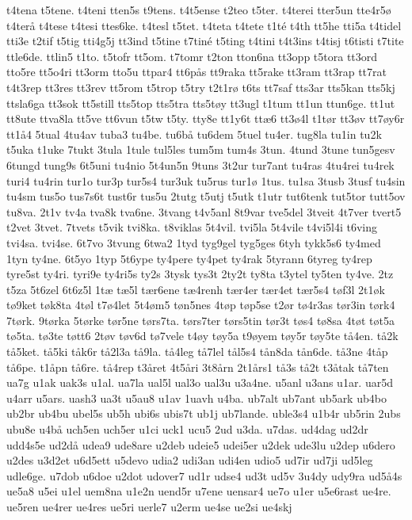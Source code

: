 {t4tena
t5tene.
t4teni
tten5s
t9tens.
t4t5ense
t2teo
t5ter.
t4terei
tter5un
tte4r5ø
t4terå
t4tese
t4tesi
ttes6ke.
t4tesl
t5tet.
t4teta
t4tete
t1té
t4th
tt5he
tti5a
t4tidel
tti3e
t2tif
t5tig
tti4g5j
tt3ind
t5tine
t7tiné
t5ting
t4tini
t4t3ins
t4tisj
t6tisti
t7tite
ttle6de.
ttlin5
t1to.
t5tofr
tt5om.
t7tomr
t2ton
tton6na
tt3opp
t5tora
tt3ord
tto5re
tt5o4ri
tt3orm
tto5u
ttpar4
tt6pås
tt9raka
tt5rake
tt3ram
tt3rap
tt7rat
t4t3rep
tt3res
tt3rev
tt5rom
t5trop
t5try
t2t1rø
t6ts
tt7saf
tts3ar
tts5kan
tts5kj
ttsla6ga
tt3sok
tt5still
tts5top
tts5tra
tts5tøy
tt3ugl
t1tum
tt1un
ttun6ge.
tt1ut
tt8ute
ttva8la
tt5ve
tt6vun
t5tw
t5ty.
tty8e
tt1y6t
ttæ6
tt3ø4l
t1tør
tt3øv
tt7øy6r
tt1å4
5tual
4tu4av
tuba3
tu4be.
tu6bå
tu6dem
5tuel
tu4er.
tug8la
tu1in
tu2k
t5uka
t1uke
7tukt
3tula
1tule
tul5les
tum5m
tum4s
3tun.
4tund
3tune
tun5gesv
6tungd
tung9s
6t5uni
tu4nio
5t4un5n
9tuns
3t2ur
tur7ant
tu4ras
4tu4rei
tu4rek
turi4
tu4rin
tur1o
tur3p
tur5s4
tur3uk
tu5rus
tur1ø
1tus.
tu1sa
3tusb
3tusf
tu4sin
tu4sm
tus5o
tus7s6t
tust6r
tus5u
2tutg
t5utj
t5utk
t1utr
tut6tenk
tut5tor
tutt5ov
tu8va.
2t1v
tv4a
tva8k
tva6ne.
3tvang
t4v5anl
8t9var
tve5del
3tveit
4t7ver
tvert5
t2vet
3tvet.
7tvets
t5vik
tvi8ka.
t8viklas
5t4vil.
tvi5la
5t4vile
t4vi5l4i
t6ving
tvi4sa.
tvi4se.
6t7vo
3tvung
6twa2
1tyd
tyg9gel
tyg5ges
6tyh
tykk5s6
ty4med
1tyn
ty4ne.
6t5yo
1typ
5t6ype
ty4pere
ty4pet
ty4rak
5tyrann
6tyreg
ty4rep
tyre5st
ty4ri.
tyri9e
ty4ri5s
ty2s
3tysk
tys3t
2ty2t
ty8ta
t3ytel
ty5ten
ty4ve.
2tz
t5za
5t6zel
6t6z5l
1tæ
tæ5l
tær6ene
tæ4renh
tær4er
tær4et
tær5s4
tøf3l
2t1øk
tø9ket
tøk8ta
4tøl
t7ø4let
5t4øm5
tøn5nes
4tøp
tøp5se
t2ør
tø4r3as
tør3in
tørk4
7tørk.
9tørka
5tørke
tør5ne
tørs7ta.
tørs7ter
tørs5tin
tør3t
tøs4
tø8sa
4tøt
tøt5a
tø5ta.
tø3te
tøtt6
2tøv
tøv6d
tø7vele
t4øy
tøy5a
t9øyem
tøy5r
tøy5te
tå4en.
tå2k
tå5ket.
tå5ki
tåk6r
tå2l3a
tå9la.
tå4leg
tå7lel
tål5s4
tån8da
tån6de.
tå3ne
4tåp
tå6pe.
t1åpn
tå6re.
tå4rep
t3året
4t5åri
3t8årn
2t1års1
tå3s
tå2t
t3åtak
tå7ten
ua7g
u1ak
uak3s
u1al.
ua7la
ual5l
ual3o
ual3u
u3a4ne.
u5anl
u3ans
u1ar.
uar5d
u4arr
u5ars.
uash3
ua3t
u5au8
u1av
1uavh
u4ba.
ub7alt
ub7ant
ub5ark
ub4bo
ub2br
ub4bu
ubel5s
ub5h
ubi6s
ubis7t
ub1j
ub7lande.
uble3s4
u1b4r
ub5rin
2ubs
ubu8e
u4bå
uch5en
uch5er
u1ci
uck1
ucu5
2ud
u3da.
u7das.
ud4dag
ud2dr
udd4s5e
ud2då
udea9
ude8are
u2deb
udeie5
udei5er
u2dek
ude3lu
u2dep
u6dero
u2des
u3d2et
u6d5ett
u5devo
udia2
udi3an
udi4en
udio5
ud7ir
ud7ji
ud5leg
udle6ge.
u7dob
u6doe
u2dot
udover7
ud1r
udse4
ud3t
ud5v
3u4dy
udy9ra
ud5å4s
ue5a8
u5ei
u1el
uem8na
u1e2n
uend5r
u7ene
uensar4
ue7o
u1er
u5e6rast
ue4re.
ue5ren
ue4rer
ue4res
ue5ri
uerle7
u2erm
ue4se
ue2si
ue4skj
}
